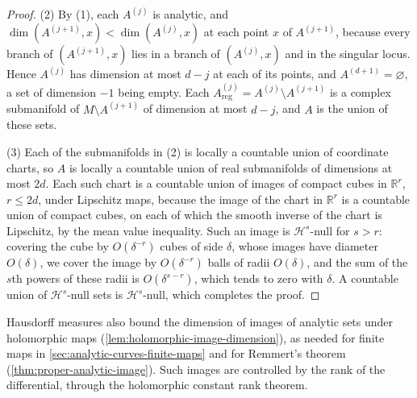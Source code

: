 \begin{proof}
(2) By (1), each $A^{(j)}$ is analytic, and $\dim(A^{(j+1)},x)<\dim(A^{(j)},x)$ at each point $x$ of $A^{(j+1)}$, because every branch of $(A^{(j+1)},x)$ lies in a branch of $(A^{(j)},x)$ and in the singular locus. Hence $A^{(j)}$ has dimension at most $d-j$ at each of its points, and $A^{(d+1)}=\varnothing$, a set of dimension $-1$ being empty. Each $A^{(j)}_{\mathrm{reg}}=A^{(j)}\setminus A^{(j+1)}$ is a complex submanifold of $M\setminus A^{(j+1)}$ of dimension at most $d-j$, and $A$ is the union of these sets.

(3) Each of the submanifolds in (2) is locally a countable union of coordinate charts, so $A$ is locally a countable union of real submanifolds of dimensions at most $2d$. Each such chart is a countable union of images of compact cubes in $\mathbb R^r$, $r\leq2d$, under Lipschitz maps, because the image of the chart in $\mathbb R^r$ is a countable union of compact cubes, on each of which the smooth inverse of the chart is Lipschitz, by the mean value inequality. Such an image is $\mathcal H^s$-null for $s>r$: covering the cube by $O(\delta^{-r})$ cubes of side $\delta$, whose images have diameter $O(\delta)$, we cover the image by $O(\delta^{-r})$ balls of radii $O(\delta)$, and the sum of the $s$th powers of these radii is $O(\delta^{s-r})$, which tends to zero with $\delta$. A countable union of $\mathcal H^s$-null sets is $\mathcal H^s$-null, which completes the proof.
\end{proof}

Hausdorff measures also bound the dimension of images of analytic sets under holomorphic maps (\cref{lem:holomorphic-image-dimension}), as needed for finite maps in \cref{sec:analytic-curves-finite-maps} and for Remmert's theorem (\cref{thm:proper-analytic-image}). Such images are controlled by the rank of the differential, through the holomorphic constant rank theorem.

